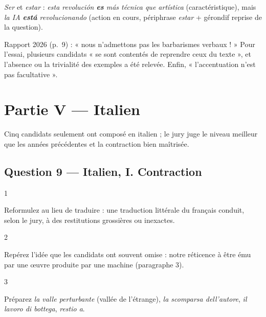 \documentclass[11pt,a4paper]{article}
\begin{document}
\begin{piege}

\emph{Ser} et \emph{estar} : \emph{esta revolución \textbf{es} más técnica que artística} (caractéristique), mais \emph{la IA \textbf{está} revolucionando} (action en cours, périphrase \emph{estar} + gérondif reprise de la question).

\end{piege}

\begin{jury}

Rapport 2026 (p.~9) : « nous n'admettons pas les barbarismes verbaux ! » Pour l'essai, plusieurs candidats « se sont contentés de reprendre ceux du texte », et l'absence ou la trivialité des exemples a été relevée. Enfin, « l'accentuation n'est pas facultative ».

\end{jury}

\hypertarget{partie-v-italien}{%
\section{Partie V --- Italien}\label{partie-v-italien}}

Cinq candidats seulement ont composé en italien ; le jury juge le niveau meilleur que les années précédentes et la contraction bien maîtrisée.

\hypertarget{question-9-italien-i.-contraction}{%
\subsection{Question 9 --- Italien, I. Contraction}\label{question-9-italien-i.-contraction}}

\begin{indication}{1}

Reformulez au lieu de traduire : une traduction littérale du français conduit, selon le jury, à des restitutions grossières ou inexactes.

\end{indication}

\begin{indication}{2}

Repérez l'idée que les candidats ont souvent omise : notre réticence à être ému par une œuvre produite par une machine (paragraphe 3).

\end{indication}

\begin{indication}{3}

Préparez \emph{la valle perturbante} (vallée de l'étrange), \emph{la scomparsa dell'autore}, \emph{il lavoro di bottega}, \emph{restio a}.

\end{indication}
\end{document}

